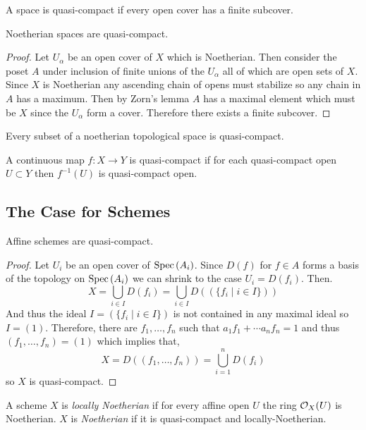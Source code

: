 \documentclass[12pt]{article}
\begin{document}
\begin{defn}
A space is quasi-compact if every open cover has a finite subcover.
\end{defn}

\begin{lemma}
Noetherian spaces are quasi-compact. 
\end{lemma}

\begin{proof}
Let $U_{\alpha}$ be an open cover of $X$ which is Noetherian. Then consider the poset $A$ under inclusion of finite unions of the $U_\alpha$ all of which are open sets of $X$. Since $X$ is Noetherian any ascending chain of opens must stabilize so any chain in $A$ has a maximum. Then by Zorn's lemma $A$ has a maximal element which must be $X$ since the $U_\alpha$ form a cover. Therefore there exists a finite subcover.
\end{proof}

\begin{cor}
Every subset of a noetherian topological space is quasi-compact.
\end{cor}

\begin{defn}
A continuous map $f : X \to Y$ is quasi-compact if for each quasi-compact open $U \subset Y$ then $f^{-1}(U)$ is quasi-compact open.
\end{defn}

\subsection{The Case for Schemes}

\begin{lemma}
Affine schemes are quasi-compact.
\end{lemma}

\begin{proof}
Let $U_i$ be an open cover of $\mathrm{Spec}\left( A_i \right)$. Since $D(f)$ for $f \in A$ forms a basis of the topology on $\mathrm{Spec}\left( A_i \right)$ we can shrink to the case $U_i = D(f_i)$. Then.
\[ X = \bigcup_{i  \in I} D(f_i) = \bigcup_{i \in I} D(( \{ f_i \mid i \in I \} )) \]
And thus the ideal $I = ( \{ f_i \mid i \in I \} )$ is not contained in any maximal ideal so $I = (1)$. Therefore, there are $f_1, \dots, f_n$ such that $a_1 f_1 + \cdots a_n f_n = 1$ and thus $(f_1, \dots, f_n) = (1)$ which implies that,
\[ X = D((f_1, \dots, f_n)) = \bigcup_{i = 1}^n D(f_i) \]
so $X$ is quasi-compact.
\end{proof}

\begin{defn}
A scheme $X$ is \textit{locally Noetherian} if for every affine open $U$ the ring $\mathcal{O}_{X}(U)$ is Noetherian. $X$ is \textit{Noetherian} if it is quasi-compact and locally-Noetherian. 
\end{defn}
\end{document}
